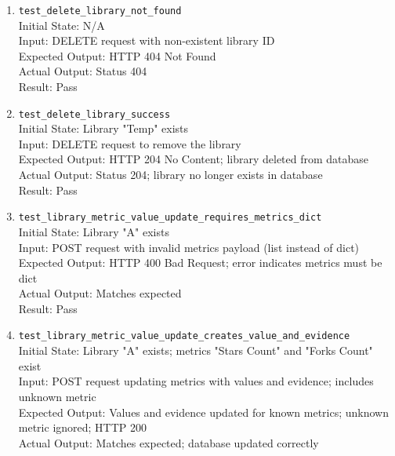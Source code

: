 \documentclass[12pt, titlepage]{article}
\begin{document}
\begin{enumerate}
      \\Actual Output: Status 400; error returned for URL
      \\Result: Pass
    \item \texttt{test\_delete\_library\_not\_found} \label{test-delete-library-not-found}
      \\Initial State: N/A
      \\Input: DELETE request with non-existent library ID
      \\Expected Output: HTTP 404 Not Found
      \\Actual Output: Status 404
      \\Result: Pass
    \item \texttt{test\_delete\_library\_success} \label{test-delete-library-success}
      \\Initial State: Library "Temp" exists
      \\Input: DELETE request to remove the library
      \\Expected Output: HTTP 204 No Content; library deleted from database
      \\Actual Output: Status 204; library no longer exists in database
      \\Result: Pass
    \item \texttt{test\_library\_metric\_value\_update\_requires\_metrics\_dict} \label{test-library-metric-value-update-requires-metrics-dict}
      \\Initial State: Library "A" exists
      \\Input: POST request with invalid metrics payload (list instead of dict)
      \\Expected Output: HTTP 400 Bad Request; error indicates metrics must be dict
      \\Actual Output: Matches expected
      \\Result: Pass
    \item \texttt{test\_library\_metric\_value\_update\_creates\_value\_and\_evidence} \label{test-library-metric-value-update-creates-value-and-evidence}
      \\Initial State: Library "A" exists; metrics "Stars Count" and "Forks Count" exist
      \\Input: POST request updating metrics with values and evidence; includes unknown metric
      \\Expected Output: Values and evidence updated for known metrics; unknown metric ignored; HTTP 200
      \\Actual Output: Matches expected; database updated correctly

\end{enumerate}
\end{document}
